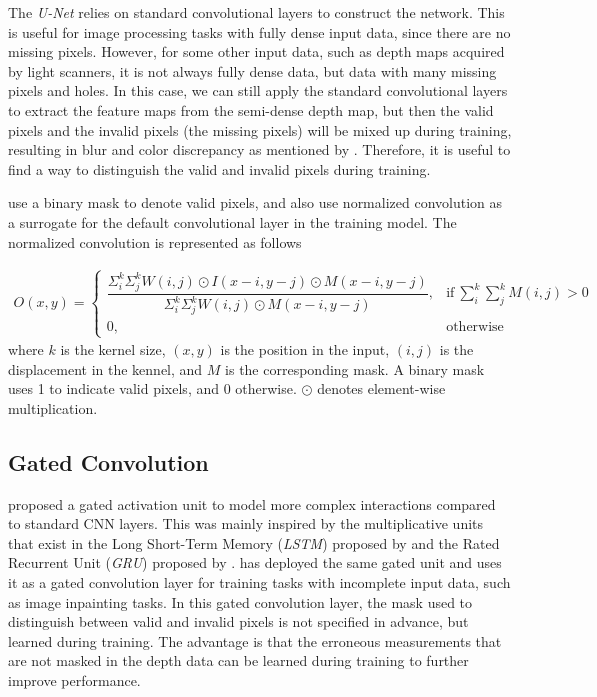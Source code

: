The \textit{U-Net} relies on standard convolutional layers to construct the network. This is useful for image processing tasks with fully dense input data, since there are no missing pixels.
However, for some other input data, such as depth maps acquired by light scanners, it is not always fully dense data, but data with many missing pixels and holes. In this case, we can still apply the standard convolutional layers to extract the feature maps from the semi-dense depth map, but then the valid pixels and the invalid pixels (the missing pixels) will be mixed up during training, resulting in blur and color discrepancy as mentioned by \cite{partial_conv}. Therefore, it is useful to find a way to distinguish the valid and invalid pixels during training. 

\cite{pncnn0} use a binary mask to denote valid pixels, and also use normalized convolution as a surrogate for the default convolutional layer in the training model. The normalized convolution is represented as follows

\begin{equation}
	\begin{array}{rrclcl}
		O(x,y) = 
		\begin{cases}
			\dfrac{\Sigma_i^k\Sigma_j^k W(i,j) \odot I(x-i,y-j) \odot M(x-i,y-j)}{\Sigma_i^k\Sigma_j^k W(i,j) \odot M(x-i,y-j)}, & \text{if}\ \sum_{i}^k\sum_{j}^k M(i,j)>0 \\
			0, & \text{otherwise}
		\end{cases}
	\end{array}
\end{equation}
where $ k $ is the kernel size, $ (x,y) $ is the position in the input, $ (i,j) $ is the displacement in the kennel, and $ M $ is the corresponding mask. A binary mask uses 1 to indicate valid pixels, and 0 otherwise. $ \odot $ denotes element-wise multiplication.



\subsection{Gated Convolution}

\cite{gated_activation} proposed a gated activation unit to model more complex interactions compared to standard CNN layers. This was mainly inspired by the multiplicative units that exist in the Long Short-Term Memory (\textit{LSTM}) proposed by \cite{lstm} and the Rated Recurrent Unit (\textit{GRU}) proposed by \cite{gru}. \cite{gconv} has deployed the same gated unit and uses it as a gated convolution layer for training tasks with incomplete input data, such as image inpainting tasks. In this gated convolution layer, the mask used to distinguish between valid and invalid pixels is not specified in advance, but learned during training. The advantage is that the erroneous measurements that are not masked in the depth data can be learned during training to further improve performance. 

